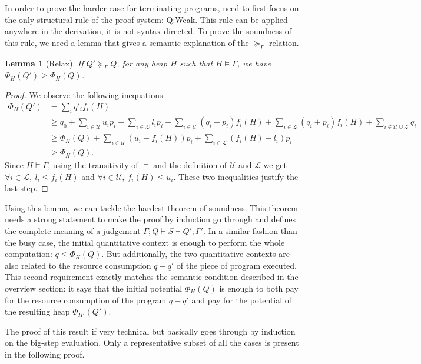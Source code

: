 \documentclass[nocopyrightspace,preprint]{sigplanconf}
\newtheorem{lemma}{Lemma}
\begin{document}
In order to prove the harder case for terminating programs, need to first
focus on the only structural rule of the proof system: {\sc Q:Weak}.  This
rule can be applied anywhere in the derivation, it is not syntax directed.
To prove the soundness of this rule, we need a lemma that gives a
semantic explanation of the $\succeq_\Gamma$ relation.

\begin{lemma}[Relax]
If $Q' \succeq_\Gamma Q$, for any heap $H$ such that $H \models \Gamma$,
we have $\Phi_H(Q') \ge \Phi_H(Q)$.
\end{lemma}
\begin{proof}
We observe the following inequations.
\begin{align*}
\Phi_H(Q') &= \sum_i q'_i f_i(H) \\
&\ge q_0 + \sum_{i\in\mathcal U} u_i p_i - \sum_{i\in\mathcal L} l_i p_i
  + \sum_{i\in\mathcal U} (q_i - p_i) f_i(H) + \sum_{i\in\mathcal L} (q_i + p_i) f_i(H)
  + \sum_{i\not\in \mathcal U \cup \mathcal L} q_i \\
 &\ge \Phi_H(Q)
  + \sum_{i\in\mathcal U} (u_i - f_i(H)) p_i
  + \sum_{i\in\mathcal L} (f_i(H) - l_i) p_i \\
 &\ge \Phi_H(Q).
\end{align*}
Since $H \models \Gamma$, using the transitivity of $\models$ and
the definition of $\mathcal U$ and $\mathcal L$ we get
$\forall i\in\mathcal L,~ l_i \le f_i(H)$ and
$\forall i\in\mathcal U,~ f_i(H)\le u_i$.
These two inequalities justify the last step.
\end{proof}

Using this lemma, we can tackle the hardest theorem of soundness.  This theorem
needs a strong statement to make the proof by induction go through and defines
the complete meaning of a judgement $\Gamma; Q \vdash S \dashv Q'; \Gamma'$.
In a similar fashion than the busy case, the initial quantitative context is enough
to perform the whole computation: $q \le \Phi_H(Q)$.  But additionally, the
two quantitative contexts are also related to the resource consumption $q - q'$
of the piece of program executed.  This second requirement exactly matches
the semantic condition described in the overview section: it says that the
initial potential $\Phi_H(Q)$ is enough to both pay for the resource
consumption of the program $q - q'$ and pay for the potential of the resulting
heap $\Phi_{H'}(Q')$.

The proof of this result if very technical but basically goes through by induction
on the big-step evaluation.  Only a representative subset of all the cases
is present in the following proof.
\end{document}
